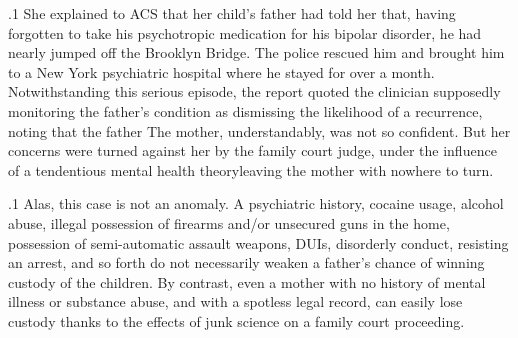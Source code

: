 \documentclass[11pt, twoside]{article}
\begin{document}
{\p.1{%
She explained to ACS that her child’s father had told her that, having
forgotten to take his psychotropic medication for his bipolar disorder, he
had nearly jumped off the Brooklyn Bridge. The police rescued him and
brought him to a New York psychiatric hospital where he stayed for over
a month. Notwithstanding this serious episode, the report quoted the
clinician supposedly monitoring the father’s condition as dismissing the
likelihood of a recurrence, noting that the father  The mother, understandably,
was not so confident. But her concerns were turned against her by the
family court judge, under the influence of a tendentious mental health
theory\mdash{}leaving the mother with nowhere to turn.
}%

\p.1{%
Alas, this case is not an anomaly. A psychiatric history, cocaine usage,
alcohol abuse, illegal possession of firearms and/or unsecured guns in
the home, possession of semi-automatic assault weapons, DUIs, disorderly conduct, resisting an arrest, and so forth do not necessarily weaken
a father’s chance of winning custody of the children. By contrast, even a
mother with no history of mental illness or substance abuse, and with a
spotless legal record, can easily lose custody thanks to the effects of junk
science on a family court proceeding.
}%





}
\end{document}
